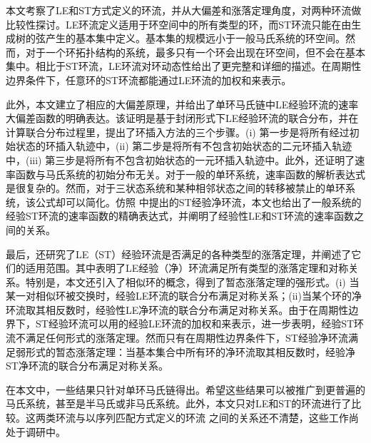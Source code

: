 本文考察了LE和ST方式定义的环流，并从大偏差和涨落定理角度，对两种环流做比较性探讨。LE环流定义适用于环空间中的所有类型的环，而ST环流只能在由生成树的弦产生的基本集中定义。基本集的规模远小于一般马氏系统的环空间。然而，对于一个环拓扑结构的系统，最多只有一个环会出现在环空间，但不会在基本集中。相比于ST环流，LE环流对环动态性给出了更完整和详细的描述。在周期性边界条件下，任意环的ST环流都能通过LE环流的加权和来表示。

此外，本文建立了相应的大偏差原理，并给出了单环马氏链中LE经验环流的速率大偏差函数的明确表达。该证明是基于封闭形式下LE经验环流的联合分布，并在计算联合分布过程里，提出了环插入方法的三个步骤。(i) 第一步是将所有经过初始状态的环插入轨迹中，(ii) 第二步是将所有不包含初始状态的二元环插入轨迹中，(iii) 第三步是将所有不包含初始状态的一元环插入轨迹中。此外，还证明了速率函数与马氏系统的初始分布无关。对于一般的单环系统，速率函数的解析表达式是很复杂的。然而，对于三状态系统和某种相邻状态之间的转移被禁止的单环系统，该公式却可以简化。仿照 \cite{bertini2015flows} 中提出的ST经验净环流，本文也给出了一般系统的经验ST环流的速率函数的精确表达式，并阐明了经验性LE和ST环流的速率函数之间的关系。

最后，还研究了LE（ST）经验环流是否满足的各种类型的涨落定理，并阐述了它们的适用范围。其中表明了LE经验（净）环流满足所有类型的涨落定理和对称关系。特别是，本文还引入了相似环的概念，得到了暂态涨落定理的强形式。(i) 当某一对相似环被交换时，经验LE环流的联合分布满足对称关系；(ii)当某个环的净环流取其相反数时，经验性LE净环流的联合分布满足对称关系。由于在周期性边界下，ST经验环流可以用的经验LE环流的加权和来表示，进一步表明，经验ST环流不满足任何形式的涨落定理。然而只有在周期性边界条件下，ST经验净环流满足弱形式的暂态涨落定理：当基本集合中所有环的净环流取其相反数时，经验净ST净环流的联合分布满足对称关系。

在本文中，一些结果只针对单环马氏链得出。希望这些结果可以被推广到更普遍的马氏系统，甚至是半马氏或非马氏系统。此外，本文只对LE和ST的环流进行了比较。这两类环流与以序列匹配方式定义的环流 \cite{roldan2019exact,biddle2020reversal,pietzonka2021cycle} 之间的关系还不清楚，这些工作尚处于调研中。